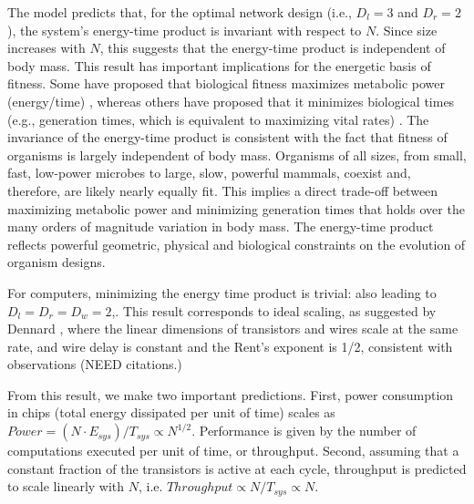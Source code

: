 \documentclass[12pt]{article}
\begin{document}
The model predicts that, for the optimal network design (i.e., $D_l=3$  
and $D_r=2$), the system's energy-time product is invariant with 
respect to $N$.  Since size increases with $N$, this suggests that the 
energy-time product is independent of body mass.   This result has 
important implications for the energetic basis of fitness.  Some have 
proposed that biological fitness maximizes metabolic power 
(energy/time) \cite{lotka56, odum71}, whereas others have proposed 
that it minimizes biological times (e.g., generation times, which is 
equivalent to maximizing vital rates) \cite{lindstedt81, sibly91}. The 
invariance of the energy-time product is consistent with the fact that 
fitness of organisms is largely independent of body mass.  Organisms 
of all sizes, from small, fast, low-power microbes to large, slow, 
powerful mammals, coexist and, therefore, are likely nearly equally 
fit.  This implies a direct trade-off between maximizing metabolic 
power and minimizing generation times that holds over the many orders 
of magnitude variation in body mass.  The energy-time product reflects 
powerful geometric, physical and biological constraints on the 
evolution of organism designs.

For computers, minimizing the energy time product is trivial: 
also leading to $D_l=D_r=D_w = 2$,.  This result corresponds to ideal scaling, as 
suggested by Dennard \cite{dennard74}, where the linear dimensions of 
transistors and wires scale at the same rate, and wire delay is 
constant and the Rent's exponent is 1/2, consistent with observations (NEED citations.)

From this result, we make two important predictions.  First, power consumption in chips (total energy dissipated per 
unit of time) scales as $Power = (N\cdot E_{sys})/T_{sys} \propto 
N^{1/2}$.  Performance is given by the  number of computations 
executed per unit of time, or throughput.  Second, assuming that a constant 
fraction of the transistors is active at each cycle, throughput is 
predicted to scale linearly with $N$,  i.e.  $Throughput\propto 
N/T_{sys} \propto N$.
\end{document}

